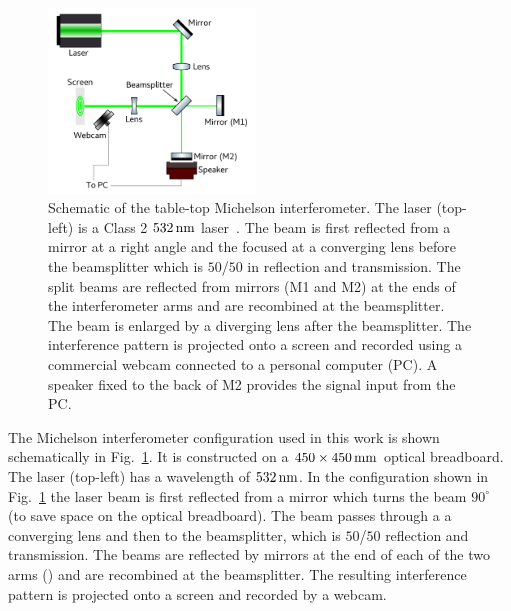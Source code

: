 \documentclass[paper-main.tex]{subfiles}
\begin{document}
\begin{figure}
	\includegraphics[width=0.49\textwidth]{figures/ifo_schematic_webcam_edit.pdf}
	\caption{\label{fig:ifo_schematic_webcam}
Schematic of the table-top Michelson interferometer. 
The laser (top-left) is a Class 2 $532\,{\rm nm}$ laser~\cite{ThorLabsIFO}. 
The beam is first reflected from a mirror at a right angle and the focused at a converging lens before the beamsplitter which is $50$/$50$ in reflection and transmission. 
The split beams are reflected from mirrors (M1 and M2) at the ends of the interferometer arms and are recombined at the beamsplitter. 
The beam is enlarged by a diverging lens after the beamsplitter. 
The interference pattern is projected onto a screen and recorded using a commercial webcam connected to a personal computer (PC). 
A speaker fixed to the back of M2 provides the signal input from the PC.  
    }
\end{figure}

The Michelson interferometer configuration used in this work is shown schematically in Fig.~\ref{fig:ifo_schematic_webcam}.
It is constructed on a $450 \times 450 \,{\rm mm} $ optical breadboard. 
The laser (top-left) has a wavelength of $532\,{\rm nm}$.
In the configuration shown in Fig.~\ref{fig:ifo_schematic_webcam} the laser beam is first reflected from a mirror which turns the beam $90^{\circ}$ (to save space on the optical breadboard). 
The beam passes through a a converging lens and then to the beamsplitter, which is $50$/$50$ reflection and transmission. 
The beams are reflected by mirrors at the end of each of the two arms () and are recombined at the beamsplitter. 
The resulting interference pattern is projected onto a screen and recorded by a webcam. 
\end{document}
